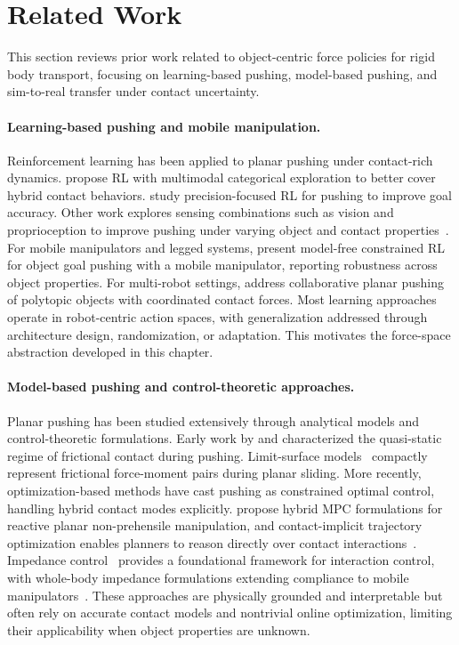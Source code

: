 \section{Related Work}
\label{sec:pho_related_work}

This section reviews prior work related to object-centric force policies for rigid body transport, focusing on learning-based pushing, model-based pushing, and sim-to-real transfer under contact uncertainty.

\paragraph{Learning-based pushing and mobile manipulation.}
Reinforcement learning has been applied to planar pushing under contact-rich dynamics. \citet{ferrandis2023nonprehensile} propose RL with multimodal categorical exploration to better cover hybrid contact behaviors. \citet{bergmann2025precision} study precision-focused RL for pushing to improve goal accuracy. Other work explores sensing combinations such as vision and proprioception to improve pushing under varying object and contact properties~\citep{cong2022vision,wang2023learning}. For mobile manipulators and legged systems, \citet{dadiotis2025dynamic} present model-free constrained RL for object goal pushing with a mobile manipulator, reporting robustness across object properties. For multi-robot settings, \citet{tang2024collaborative} address collaborative planar pushing of polytopic objects with coordinated contact forces. Most learning approaches operate in robot-centric action spaces, with generalization addressed through architecture design, randomization, or adaptation. This motivates the force-space abstraction developed in this chapter.

\paragraph{Model-based pushing and control-theoretic approaches.}
Planar pushing has been studied extensively through analytical models and control-theoretic formulations. Early work by \citet{mason1986mechanics} and \citet{lynch1996stable} characterized the quasi-static regime of frictional contact during pushing. Limit-surface models~\citep{goyal1991planar} compactly represent frictional force-moment pairs during planar sliding. More recently, optimization-based methods have cast pushing as constrained optimal control, handling hybrid contact modes explicitly. \citet{hogan2018reactive,hogan2020reactive} propose hybrid MPC formulations for reactive planar non-prehensile manipulation, and contact-implicit trajectory optimization enables planners to reason directly over contact interactions~\citep{bui2025push}. Impedance control~\citep{hogan1985impedance} provides a foundational framework for interaction control, with whole-body impedance formulations extending compliance to mobile manipulators~\citep{dietrich2016wholebody}. These approaches are physically grounded and interpretable but often rely on accurate contact models and nontrivial online optimization, limiting their applicability when object properties are unknown.

